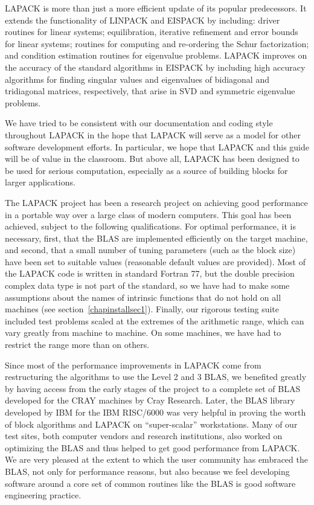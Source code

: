 LAPACK is more than just a more efficient update of its popular predecessors.
It extends the functionality of LINPACK and EISPACK by including:
driver routines for linear systems;
equilibration, iterative 
refinement and error 
bounds for linear systems; 
routines for computing and re-ordering the Schur 
factorization;
and condition estimation routines for eigenvalue problems.
LAPACK improves on the accuracy of the standard algorithms in EISPACK
by including high accuracy algorithms for finding singular values and
eigenvalues of bidiagonal and tridiagonal matrices, respectively,
that arise in SVD and symmetric eigenvalue problems.

We have tried to be consistent with our documentation and
coding style throughout LAPACK in the hope that LAPACK will serve
as a model for other software development efforts.
In particular, we hope that LAPACK and this guide will
be of value in the classroom.
But above all, LAPACK has been designed to be used for serious
computation, especially
as a source of building blocks for larger applications.

The LAPACK project has been a research project on achieving good
performance in a portable way over a large class of modern computers.
This goal has been achieved, subject to the following qualifications.
For optimal performance, it is necessary, first, that 
the BLAS are implemented efficiently on the
target machine, and second, that a small number of tuning parameters
(such as the block size) have been set to suitable values
(reasonable default values are provided). 
Most of the LAPACK code is written in standard Fortran 77,
but the double precision complex data type is not part of the standard,
so we have had to make some assumptions about the names of intrinsic
functions that do not hold on all machines (see section~\ref{chapinstallsec1}).
Finally, our rigorous testing suite included test problems scaled
at the extremes of the arithmetic range,
which can vary greatly from machine to machine.
On some machines, we have had to restrict the range more than on others.

Since most of the performance improvements in LAPACK come from
restructuring the algorithms to use the Level 2 and 3 BLAS,
we benefited greatly by having access from the early stages of the
project to a complete set of BLAS developed for the CRAY machines
by Cray Research.  Later, the BLAS library developed by IBM for the
IBM RISC/6000 was very helpful in proving the worth of block algorithms
and LAPACK on ``super-scalar'' workstations.  Many of our test sites, both
computer vendors and research institutions, also worked on optimizing
the BLAS and thus helped to get good performance from LAPACK.
We are very pleased at the extent to which the user community has
embraced the BLAS, not only for performance reasons, but also because
we feel developing software around a core set of common routines
like the BLAS is good software engineering practice.

